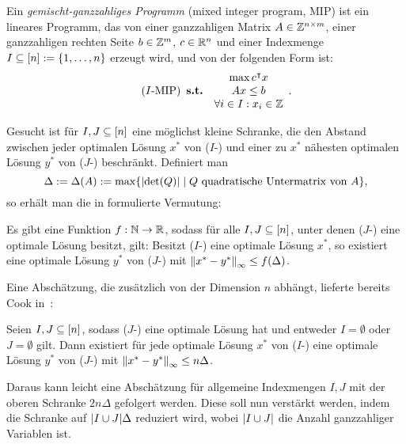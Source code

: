 Ein \emph{gemischt-ganzzahliges Programm} (mixed integer program, MIP) ist ein lineares Programm, das von einer ganzzahligen Matrix $A\in\mathbb{Z}^{n\times m}$, einer ganzzahligen rechten Seite $b\in\mathbb{Z}^m$, $c\in\mathbb{R}^n$ und einer Indexmenge $I\subseteq[n]:=\{1,\dots,n\}$ erzeugt wird, und von der folgenden Form ist:
\begin{equation}\tag{$I$-\MIPI}
\begin{array}{lc}
&\max c\transpose x \\
\subjectTo &Ax\leq b\\
&\forall i\in I: x_i\in\Z
\end{array}.
\end{equation}

Gesucht ist für $I,J\subseteq[n]$ eine möglichst kleine Schranke, die den Abstand zwischen jeder optimalen Lösung $x^*$ von ($I$-\MIPI) und einer zu $x^*$ nähesten optimalen Lösung $y^*$ von ($J$-\MIPI) beschränkt.
Definiert man
$$\Delta:=\Delta(A):=\max\{\lvert  \det(Q) \rvert \mid Q \text{ quadratische Untermatrix von } A \},$$
so erhält man die in \cite{Paat2018} formulierte Vermutung:

\renewcommand{\theconjecture}{1.1}
\begin{conjecture}\label{con:delta}
	Es gibt eine Funktion $f: \mathbb{N}\rightarrow\mathbb{R}$, sodass für alle $I,J\subseteq[n]$, unter denen ($J$-\MIPI) eine optimale Lösung besitzt, gilt:
	Besitzt ($I$-\MIPI) eine optimale Lösung $x^*$, so existiert eine optimale 
	Lösung $y^*$ von ($J$-\MIPI) mit $\left\lVert x^* - y^*\right\rVert_\infty\leq f(\Delta)$.
\end{conjecture}

Eine Abschätzung, die zusätzlich von der Dimension $n$ abhängt, lieferte bereits Cook in~\cite[Theorem 1 und Bemerkung 1]{Cook1986}:

\renewcommand{\thetheorem}{2.1}
\begin{theorem}[Cook et al., 1986]\label{thm:cook}
	Seien $I, J\subseteq[n]$, sodass ($J$-\MIPI) eine optimale Lösung hat und entweder $I=\emptyset$ oder $J=\emptyset$ gilt.
	Dann existiert für jede optimale Lösung $x^*$ von ($I$-\MIPI) eine optimale Lösung $y^*$ von ($J$-\MIPI) mit $\left\lVert x^*-y^*\right\rVert_\infty\leq n\Delta$.
\end{theorem}

Daraus kann leicht eine Abschätzung für allgemeine Indexmengen $I,J$ mit der oberen Schranke $2n\Delta$ gefolgert werden.
Diese soll nun verstärkt werden, indem die Schranke auf $\lvert I\cup J \rvert\Delta$ reduziert wird, wobei $\lvert I\cup J \rvert$ die Anzahl ganzzahliger Variablen ist.

